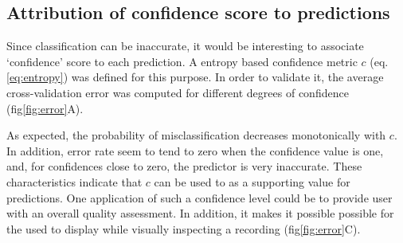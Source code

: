 \subsection{Attribution of confidence score to predictions}
Since classification can be inaccurate, it would be interesting to associate `confidence' score to each prediction.
A entropy based confidence metric $c$ (eq. \ref{eq:entropy}) was defined for this purpose.
In order to validate it, the average cross-validation error was computed for different degrees of confidence (fig\ref{fig:error}A).



As expected, the probability of misclassification decreases monotonically with $c$.
In addition, error rate seem to tend to zero when the confidence value is one, and, for confidences close to zero, the predictor is very inaccurate.
These characteristics indicate that $c$ can be used to as a supporting value for predictions.
One application of such a confidence level could be to provide user with an overall quality assessment.
In addition, it  makes it possible possible for the used to display while visually inspecting a recording (fig\ref{fig:error}C).
